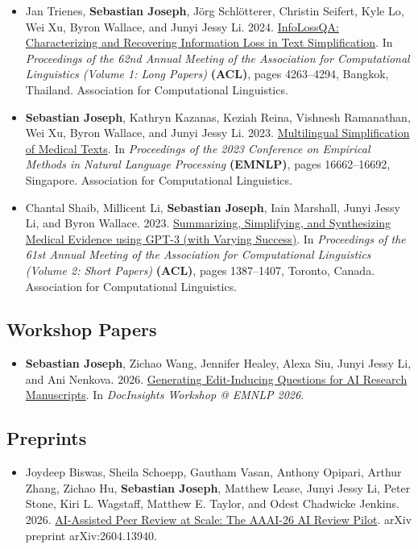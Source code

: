 \documentclass[11pt]{article}
\begin{document}
\begin{itemize}
{ } 
    \item { 
Jan Trienes, \textbf{Sebastian Joseph}, Jörg Schlötterer, Christin Seifert, Kyle Lo, Wei Xu, Byron Wallace, and Junyi Jessy Li. 2024. \href{https://aclanthology.org/2024.acl-long.234}{InfoLossQA: Characterizing and Recovering Information Loss in Text Simplification}. In \textit{Proceedings of the 62nd Annual Meeting of the Association for Computational Linguistics (Volume 1: Long Papers)} \textbf{(ACL)}, pages 4263–4294, Bangkok, Thailand. Association for Computational Linguistics.
 }
    \item { 
\textbf{Sebastian Joseph}, Kathryn Kazanas, Keziah Reina, Vishnesh Ramanathan, Wei Xu, Byron Wallace, and Junyi Jessy Li. 2023. \href{https://aclanthology.org/2023.emnlp-main.1037}{Multilingual Simplification of Medical Texts}. In \textit{Proceedings of the 2023 Conference on Empirical Methods in Natural Language Processing} \textbf{(EMNLP)}, pages 16662–16692, Singapore. Association for Computational Linguistics.
 }
    \item { 
Chantal Shaib, Millicent Li, \textbf{Sebastian Joseph}, Iain Marshall, Junyi Jessy Li, and Byron Wallace. 2023. \href{https://aclanthology.org/2023.acl-short.119}{Summarizing, Simplifying, and Synthesizing Medical Evidence using GPT-3 (with Varying Success)}. In \textit{Proceedings of the 61st Annual Meeting of the Association for Computational Linguistics (Volume 2: Short Papers)} \textbf{(ACL)}, pages 1387–1407, Toronto, Canada. Association for Computational Linguistics.
 }
\end{itemize}
\subsection{Workshop Papers}
\begin{itemize}
    \item {
\textbf{Sebastian Joseph}, Zichao Wang, Jennifer Healey, Alexa Siu, Junyi Jessy Li, and Ani Nenkova. 2026. \href{https://arxiv.org/abs/2609.36617}{Generating Edit-Inducing Questions for AI Research Manuscripts}. In \textit{DocInsights Workshop @ EMNLP 2026}.
 }
\end{itemize}
\subsection{Preprints}
\begin{itemize}
    \item {
Joydeep Biswas, Sheila Schoepp, Gautham Vasan, Anthony Opipari, Arthur Zhang, Zichao Hu, \textbf{Sebastian Joseph}, Matthew Lease, Junyi Jessy Li, Peter Stone, Kiri L. Wagstaff, Matthew E. Taylor, and Odest Chadwicke Jenkins. 2026. \href{https://arxiv.org/abs/2604.13940}{AI-Assisted Peer Review at Scale: The AAAI-26 AI Review Pilot}. arXiv preprint arXiv:2604.13940.
 }
\end{itemize}
\end{document}
